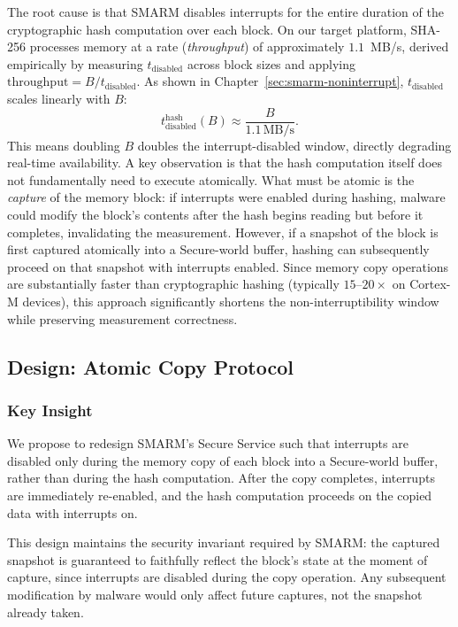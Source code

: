 \documentclass[a4paper,10pt]{article}
\begin{document}
{The root cause is that SMARM disables interrupts for the entire 
duration of the cryptographic hash computation over each block. 
On our target platform, SHA-256 processes memory at a rate 
(\emph{throughput}) of approximately $1.1$~MB/s, derived 
empirically by measuring $t_{\mathrm{disabled}}$ across block sizes 
and applying $\mathrm{throughput} = B / t_{\mathrm{disabled}}$. As shown in Chapter~\ref{sec:smarm-noninterrupt}, 
$t_{\mathrm{disabled}}$ scales linearly with $B$:
\[
t_{\mathrm{disabled}}^{\text{hash}}(B) \approx \frac{B}{1.1\,\text{MB/s}}.
\]
This means doubling $B$ doubles the interrupt-disabled window, 
directly degrading real-time availability. A key observation is that the hash computation itself does not 
fundamentally need to execute atomically. What must be atomic is 
the \emph{capture} of the memory block: if interrupts were enabled 
during hashing, malware could modify the block's contents after the 
hash begins reading but before it completes, invalidating the 
measurement. However, if a snapshot of the block is first captured 
atomically into a Secure-world buffer, hashing can subsequently 
proceed on that snapshot with interrupts enabled. Since memory copy 
operations are substantially faster than cryptographic hashing 
(typically $15$--$20\times$ on Cortex-M devices), this approach 
significantly shortens the non-interruptibility window while 
preserving measurement correctness.


\subsection{Design: Atomic Copy Protocol}

\subsubsection{Key Insight}

We propose to redesign SMARM's Secure Service such that interrupts 
are disabled only during the memory copy of each block into a 
Secure-world buffer, rather than during the hash computation. After 
the copy completes, interrupts are immediately re-enabled, and the 
hash computation proceeds on the copied data with interrupts on.

This design maintains the security invariant required by SMARM: 
the captured snapshot is guaranteed to faithfully reflect the 
block's state at the moment of capture, since interrupts are 
disabled during the copy operation. Any subsequent modification 
by malware would only affect future captures, not the snapshot 
already taken.

}
\end{document}
